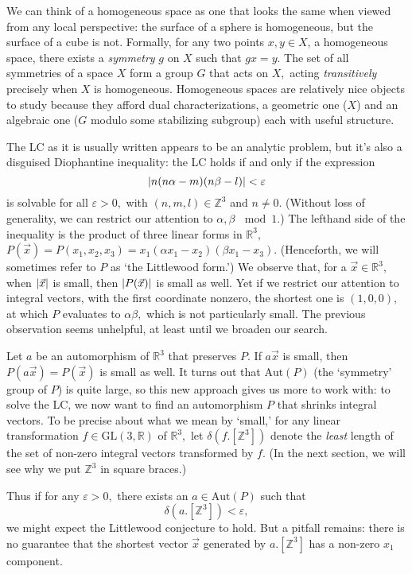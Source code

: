 \documentclass[12pt, letterpaper, oneside]{book}
\newcommand{\ga}{\ensuremath{\alpha}}
\newcommand{\gb}{\ensuremath{\beta}}
\renewcommand{\ge}{\ensuremath{\varepsilon}}
\newcommand{\R}{\mathbb{R}}
\newcommand{\Z}{\mathbb{Z}}
\DeclarePairedDelimiter{\abs}{\lvert}{\rvert}
\theoremstyle{plain}
\theoremstyle{definition}
\theoremstyle{remark}
\begin{document}
 We can think of a homogeneous space as one that looks the same when viewed from any local perspective: the surface of a sphere is homogeneous, but the surface of a cube is not. Formally, for any two points $x, y \in X$, a homogeneous space, there exists a \textit{symmetry} $g$ on $X$ such that $gx = y.$ The set of all symmetries of a space $X$ form a group $G$ that acts on $X,$ acting \textit{transitively} precisely when $X$ is homogeneous. Homogeneous spaces are relatively nice objects to study because they afford dual characterizations, a geometric one ($X$) and an algebraic one ($G$ modulo some stabilizing subgroup) each with useful structure.
 
The LC as it is usually written appears to be an analytic problem, but it's also a disguised Diophantine inequality: the LC holds if and only if the expression
\[
\abs{n(n \ga - m)(n \gb - l)} < \ge
\]
is solvable for all $\ge > 0,$ with $(n,m,l) \in \Z^3$ and $n \neq 0.$ (Without loss of generality, we can restrict our attention to $\ga,\gb\,\mod 1.$) The lefthand side of the inequality is the product of three linear forms in $\R^3,$ $P(\vec{x}) = P(x_1,x_2,x_3) = x_1(\ga x_1 - x_2)(\gb x_1 - x_3)$. (Henceforth, we will sometimes refer to $P$ as `the Littlewood form.') We observe that, for a $\vec{x} \in \R^3,$ when $\abs{\vec{x}}$ is small, then $\abs{P(\vec{x})}$ is small as well. Yet if we restrict our attention to integral vectors, with the first coordinate nonzero, the shortest one is  $(1, 0, 0),$ at which $P$ evaluates to  $\ga \gb,$ which is not particularly small. The previous observation seems unhelpful, at least until we broaden our search. 

Let $a$ be an automorphism of $\R^3$ that preserves $P.$ If $a\vec{x}$ is small, then $P(a\vec{x}) = P(\vec{x})$ is small as well. It turns out that $\mbox{Aut}(P)$ (the `symmetry' group of $P$) is quite large, so this new approach gives us more to work with: to solve the LC, we now want to find an automorphism  $P$ that shrinks integral vectors. To be precise about what we mean by `small,' for any linear transformation $f \in \mbox{GL}(3,\R)$ of $\R^3,$ let $\delta(f . [\Z^3])$ denote the \textit{least} length of the set of non-zero integral vectors transformed by $f.$ (In the next section, we will see why we put $\Z^3$ in square braces.)

Thus if for any $\ge > 0,$ there exists an $a \in \mbox{Aut}(P)$ such that 
\[
\delta(a . [\Z^3]) < \ge,
\]
we might expect the Littlewood conjecture to hold. But a pitfall remains: there is no guarantee that the shortest vector $\vec{x}$ generated by $a.[\Z^3]$ has a non-zero $x_1$ component. 
\end{document}
